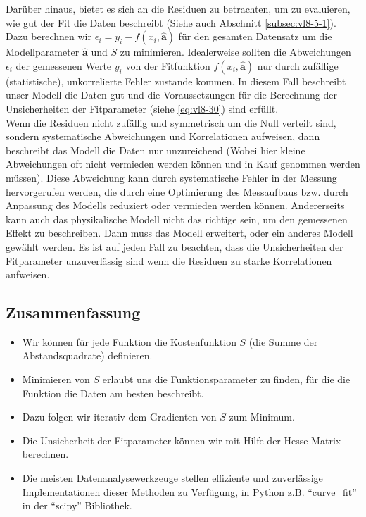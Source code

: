 Darüber hinaus, bietet es sich an die Residuen zu betrachten, um zu evaluieren, wie gut der Fit die Daten beschreibt (Siehe auch Abschnitt \ref{subsec:vl8-5-1}). Dazu berechnen wir $\epsilon_i =y_i - f(x_i, \boldsymbol{\hat{a}})$ für den gesamten Datensatz um die Modellparameter $\boldsymbol{\hat{a}}$ und $S$ zu minimieren. Idealerweise sollten die Abweichungen $\epsilon_i$ der gemessenen Werte $y_i$ von der Fitfunktion $f(x_i, \boldsymbol{\hat{a}})$ nur durch zufällige (statistische), unkorrelierte Fehler zustande kommen. In diesem Fall beschreibt unser Modell die Daten gut und die Voraussetzungen für die Berechnung der Unsicherheiten der Fitparameter (siehe \cref{eq:vl8-30}) sind erfüllt.\\
Wenn die Residuen nicht zufällig und symmetrisch um die Null verteilt sind, sondern systematische Abweichungen und Korrelationen aufweisen, dann beschreibt das Modell die Daten nur unzureichend (Wobei hier kleine Abweichungen oft nicht vermieden werden können und in Kauf genommen werden müssen). Diese Abweichung kann durch systematische Fehler in der Messung hervorgerufen werden, die durch eine Optimierung des Messaufbaus bzw. durch Anpassung des Modells reduziert oder vermieden werden können. Andererseits kann auch das physikalische Modell nicht das richtige sein, um den gemessenen Effekt zu beschreiben. Dann muss das Modell erweitert, oder ein anderes Modell gewählt werden. Es ist auf jeden Fall zu beachten, dass die Unsicherheiten der Fitparameter unzuverlässig sind wenn die Residuen zu starke Korrelationen aufweisen.



\subsection{Zusammenfassung}
\label{subsec:vl9-4}

\begin{itemize}
    \setlength\itemsep{0em}
        \item Wir können für jede Funktion die Kostenfunktion $S$ (die Summe der Abstandsquadrate) definieren.
        \item Minimieren von $S$ erlaubt uns die Funktionsparameter zu finden, für die die Funktion die Daten am besten beschreibt.
        \item Dazu folgen wir iterativ dem Gradienten von $S$ zum Minimum.
        \item Die Unsicherheit der Fitparameter können wir mit Hilfe der Hesse-Matrix berechnen.
        \item Die meisten Datenanalysewerkzeuge stellen effiziente und zuverlässige Implementationen dieser Methoden zu Verfügung, in Python z.B. ``curve\_fit'' in der ``scipy'' Bibliothek.
\end{itemize}


